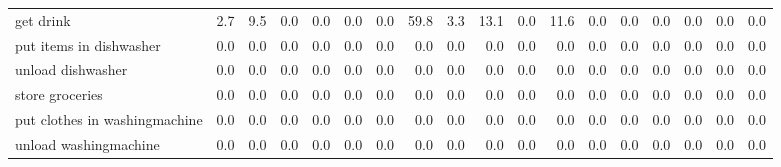 \documentclass{article}
\begin{document}
\begin{sideways}
\begin{tabular}{lrrrrrrrrrrrrrrrrr}
get drink                     &         2.7 &                9.5 &           0.0 &               0.0 &                0.0 &                0.0 &             59.8 &                      3.3 &                  13.1 &              0.0 &             11.6 &                            0.0 &                      0.0 &                    0.0 &                                  0.0 &                          0.0 &                  0.0 \\
put items in dishwasher       &         0.0 &                0.0 &           0.0 &               0.0 &                0.0 &                0.0 &              0.0 &                      0.0 &                   0.0 &              0.0 &              0.0 &                            0.0 &                      0.0 &                    0.0 &                                  0.0 &                          0.0 &                  0.0 \\
unload dishwasher             &         0.0 &                0.0 &           0.0 &               0.0 &                0.0 &                0.0 &              0.0 &                      0.0 &                   0.0 &              0.0 &              0.0 &                            0.0 &                      0.0 &                    0.0 &                                  0.0 &                          0.0 &                  0.0 \\
store groceries               &         0.0 &                0.0 &           0.0 &               0.0 &                0.0 &                0.0 &              0.0 &                      0.0 &                   0.0 &              0.0 &              0.0 &                            0.0 &                      0.0 &                    0.0 &                                  0.0 &                          0.0 &                  0.0 \\
put clothes in washingmachine &         0.0 &                0.0 &           0.0 &               0.0 &                0.0 &                0.0 &              0.0 &                      0.0 &                   0.0 &              0.0 &              0.0 &                            0.0 &                      0.0 &                    0.0 &                                  0.0 &                          0.0 &                  0.0 \\
unload washingmachine         &         0.0 &                0.0 &           0.0 &               0.0 &                0.0 &                0.0 &              0.0 &                      0.0 &                   0.0 &              0.0 &              0.0 &                            0.0 &                      0.0 &                    0.0 &                                  0.0 &                          0.0 &                  0.0 \\

\end{tabular}
\end{sideways}
\end{document}
